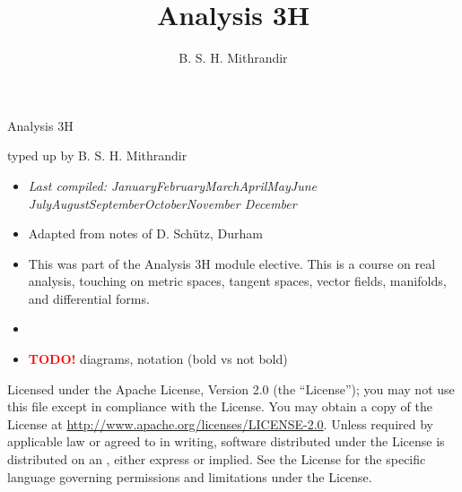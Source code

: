 \documentclass[letter-paper]{tufte-book}
\title{Analysis 3H}
\author[]{B. S. H. Mithrandir}
\newcommand{\monthyear}{%
  \ifcase\month\or January\or February\or March\or April\or May\or June\or
  July\or August\or September\or October\or November\or
  December\fi\space\number\year
}
\newcommand{\TODO}{\textcolor{red}{\bf TODO!}\xspace}
\begin{document}



\chapter*{}

\begin{fullwidth}

\par \begin{center}{\Huge Analysis 3H}\end{center}

\vspace*{5mm}

\par \begin{center}{\Large typed up by B. S. H. Mithrandir}\end{center}

\vspace*{5mm}

\begin{itemize}
  \item \textit{Last compiled: \monthyear}
  \item Adapted from notes of D. Sch\"utz, Durham
  \item This was part of the Analysis 3H module elective. This is a course on
  real analysis, touching on metric spaces, tangent spaces, vector fields,
  manifolds, and differential forms.
  \item[]
  \item \TODO diagrams, notation (bold vs not bold)
\end{itemize}

\par

\par Licensed under the Apache License, Version 2.0 (the ``License''); you may not
use this file except in compliance with the License. You may obtain a copy
of the License at \url{http://www.apache.org/licenses/LICENSE-2.0}. Unless
required by applicable law or agreed to in writing, software distributed
under the License is distributed on an , either express or implied. See the
License for the specific language governing permissions and limitations
under the License.
\end{fullwidth}
\end{document}
